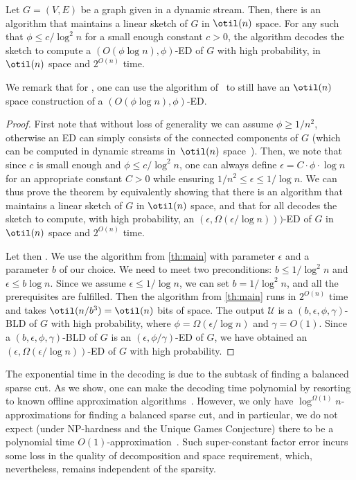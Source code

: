 \begin{mainthactual}
	\label{cor:maingeneral}
	Let $G=(V, E)$ be a graph given in a dynamic stream. Then, there is an algorithm that maintains a linear sketch of $G$ in $\otil(n)$ space. For any   such that $ \phi \le c/\log^2 n$ for a small enough constant $c>0$, the algorithm decodes the sketch to compute a $(O(\phi \log n), \phi)$-ED of $G$ with high probability, in $\otil(n)$ space and $2^{O(n)}$ time.
\end{mainthactual}
\noindent
We remark that for , one can use the algorithm of~\cite{streamexpdec} to still have an $\otil(n)$ space construction of a $(O(\phi \log n), \phi)$-ED.
\begin{proof}
	First note that without loss of generality we can assume $\phi \ge 1/n^2$, otherwise an ED can simply consists of the connected components of $G$ (which can be computed in dynamic streams in~$\otil(n)$ space~\cite{linmeas}). Then, we note that since $c$ is small enough and $\phi \le c / \log^2 n$, one can always define $\epsilon = C \cdot \phi \cdot \log n$ for an appropriate constant $C>0$ while ensuring $1/n^2 \le \epsilon \le 1/\log n$. We can thus prove the theorem by equivalently showing that there is an algorithm that maintains a linear sketch of $G$ in $\otil(n)$ space, and that for all \smash{$\epsilon \in [{1}/{n^2},{1}/{\log n}]$} decodes the sketch to compute, with high probability, an $(\epsilon, \Omega(\epsilon / \log n)))$-ED of $G$ in $\otil(n)$ space and $2^{O(n)}$ time.
	
	Let then \smash{$\epsilon \in [{1}/{n^2},{1}/{\log n}]$}. We use the algorithm from \cref{th:main} with parameter $\epsilon$ and a parameter $b$ of our choice. We need to meet two preconditions: $b \le 1/\log^2 n$ and $\epsilon \le b \log n$. Since we assume $\epsilon \le 1/\log n$, we can set $b=1/\log^2 n$, and all the prerequisites are fulfilled. Then the algorithm from \cref{th:main} runs in $2^{O(n)}$ time and takes $\otil(n/b^3)=\otil(n)$ bits of space. The output $\mathcal{U}$ is a $(b, \epsilon, \phi, \gamma)$-BLD of $G$ with high probability, where $\phi = \Omega(\epsilon/\log n)$ and $\gamma =O(1)$. Since a $(b, \epsilon, \phi, \gamma)$-BLD of $G$ is an $(\epsilon,\phi/\gamma)$-ED of $G$, we have obtained an $(\epsilon, \Omega(\epsilon/\log n))$-ED of $G$ with high probability.
\end{proof}
\noindent
The exponential time in the decoding is due to the subtask of finding a balanced sparse cut. As we show, one can make the decoding time polynomial by resorting to known offline approximation algorithms~\cite{offlineexpdec,liexpdec}. However, we only have $\log^{\Omega(1)} n$-approximations for finding a balanced sparse cut, and in particular, we do not expect (under NP-hardness and the Unique Games Conjecture) there to be a polynomial time $O(1)$-approximation~\cite{hardsparsecut}. Such super-constant factor error incurs some loss in the quality of decomposition and space requirement, which, nevertheless, remains independent of the sparsity.


